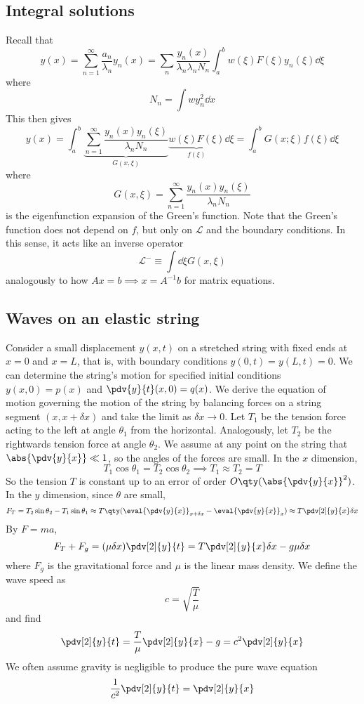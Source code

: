 \subsection{Integral solutions}
Recall that
\[
	y(x) = \sum_{n=1}^\infty \frac{a_n}{\lambda_n} y_n(x) = \sum_n \frac{y_n(x)}{\lambda_n \lambda_n N_n} \int_a^b w(\xi) F(\xi) y_n(\xi) \dd{\xi}
\]
where
\[
	N_n = \int w y_n^2 \dd{x}
\]
This then gives
\[
	y(x) = \int_a^b \underbrace{\sum_{n=1}^\infty \frac{y_n(x) y_n(\xi)}{\lambda_n N_n}}_{G(x,\xi)} \underbrace{w(\xi) F(\xi)}_{f(\xi)} \dd{\xi} = \int_a^b G(x;\xi) f(\xi) \dd{\xi}
\]
where
\[
	G(x,\xi) = \sum_{n=1}^\infty \frac{y_n(x) y_n(\xi)}{\lambda_n N_n}
\]
is the eigenfunction expansion of the Green's function.
Note that the Green's function does not depend on \( f \), but only on \( \mathcal L \) and the boundary conditions.
In this sense, it acts like an inverse operator
\[
	\mathcal L^- \equiv \int \dd{\xi} G(x,\xi)
\]
analogously to how \( Ax = b \implies x = A^{-1} b \) for matrix equations.

\subsection{Waves on an elastic string}
Consider a small displacement \( y(x,t) \) on a stretched string with fixed ends at \( x = 0 \) and \( x = L \), that is, with boundary conditions \( y(0,t) = y(L,t) = 0 \).
We can determine the string's motion for specified initial conditions \( y(x,0) = p(x) \) and \( \pdv{y}{t}(x,0) = q(x) \).
We derive the equation of motion governing the motion of the string by balancing forces on a string segment \( (x,x+\delta x) \) and take the limit as \( \delta x \to 0 \).
Let \( T_1 \) be the tension force acting to the left at angle \( \theta_1 \) from the horizontal.
Analogously, let \( T_2 \) be the rightwards tension force at angle \( \theta_2 \).
We assume at any point on the string that \( \abs{\pdv{y}{x}} \ll 1 \), so the angles of the forces are small.
In the \( x \) dimension,
\[
	T_1 \cos \theta_1 = T_2 \cos \theta_2 \implies T_1 \approx T_2 = T
\]
So the tension \( T \) is constant up to an error of order \( O\qty(\abs{\pdv{y}{x}
}^2) \).
In the \( y \) dimension, since \( \theta \) are small,
\[
	F_T = T_2 \sin \theta_2 - T_1 \sin \theta_1 \approx T \qty(\eval{\pdv{y}{x}}_{x + \delta x} - \eval{\pdv{y}{x}}_x) \approx T \pdv[2]{y}{x} \delta x
\]
By \( F = ma \),
\[
	F_T + F_g = (\mu \delta x) \pdv[2]{y}{t} = T \pdv[2]{y}{x} \delta x - g \mu \delta x
\]
where \( F_g \) is the gravitational force and \( \mu \) is the linear mass density.
We define the wave speed as
\[
	c = \sqrt{\frac{T}{\mu}}
\]
and find
\[
	\pdv[2]{y}{t} = \frac{T}{\mu} \pdv[2]{y}{x} - g = c^2 \pdv[2]{y}{x}
\]
We often assume gravity is negligible to produce the pure wave equation
\[
	\frac{1}{c^2} \pdv[2]{y}{t} = \pdv[2]{y}{x}
\]
